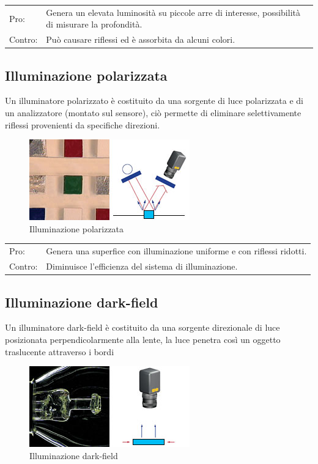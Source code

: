 \begin{centering}

\begin{tabularx}{\textwidth}{l p{}}
Pro: &  Genera un elevata luminosità su piccole arre di interesse, possibilità di misurare la profondità.\\
Contro: &  Può causare riflessi ed è assorbita da alcuni colori.\\
\end{tabularx}
\end{centering}

\subsection{Illuminazione polarizzata}
Un illuminatore polarizzato è costituito da una sorgente di luce polarizzata e di
un analizzatore (montato sul sensore), ciò permette di eliminare selettivamente
riflessi provenienti da specifiche direzioni.

\begin{figure}[!h]
\centering
\includegraphics[width=.3\textwidth]{img/illuminazione-polarizzata.jpg}
\caption{Illuminazione polarizzata}\label{fig:illuminazione-polarizzata}
\end{figure}

\begin{centering}

\begin{tabular}{l l}
Pro: &  Genera una superfice con illuminazione uniforme e con riflessi ridotti.\\
Contro: &  Diminuisce l'efficienza del sistema di illuminazione.\\
\end{tabular}
\end{centering}

\subsection{Illuminazione dark-field}
Un illuminatore dark-field è costituito da una sorgente direzionale di luce posizionata perpendicolarmente
alla lente, la luce penetra così un oggetto traslucente attraverso i bordi

\begin{figure}[!h]
\centering
\includegraphics[width=.3\textwidth]{img/illuminazione-darkfield.jpg}
\caption{Illuminazione dark-field}\label{fig:illuminazione-darkfield}
\end{figure}

